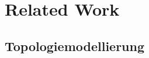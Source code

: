 \documentclass[ngerman,compress,hyperref={bookmarks}]{beamer}
\begin{document}


\section{Related Work}

\subsection{Topologiemodellierung}
\end{document}
